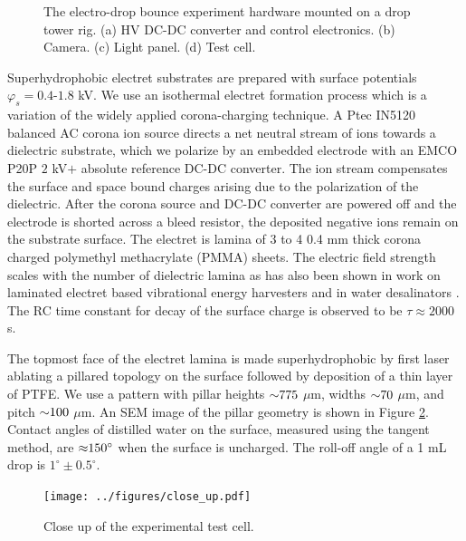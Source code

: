 \documentclass[aip,reprint, floatfix]{revtex4-1}
\begin{document}
\begin{figure}
    \centering
    \fontsize{12pt}{13pt}\selectfont
    \def\svgwidth{\columnwidth}
    \caption{The electro-drop bounce experiment hardware mounted on a drop tower rig. (a) HV DC-DC converter and control electronics. (b) Camera. (c) Light panel. (d) Test cell. \label{fig:rig}}
\end{figure}

Superhydrophobic electret substrates are prepared with surface potentials $\varphi_s = 0.4$-$1.8$ kV. We use an isothermal electret formation process which is a variation of the widely applied corona-charging technique. A Ptec IN5120 balanced AC corona ion source directs a net neutral stream of ions towards a dielectric substrate, which we polarize by an embedded electrode with an EMCO P20P $2$ kV$+$ absolute reference DC-DC converter. The ion stream compensates the surface and space bound charges arising due to the polarization of the dielectric. After the corona source and DC-DC converter are powered off and the electrode is shorted across a bleed resistor, the deposited negative ions remain on the substrate surface. The electret is lamina of 3 to 4 0.4 mm thick corona charged polymethyl methacrylate (PMMA) sheets. The electric field strength scales with the number of dielectric lamina as has also been shown in work on laminated electret based vibrational energy harvesters \cite{wada_stacking_2012} and in water desalinators \cite{ni_desalination_2005}. The RC time constant for decay of the surface charge is observed to be $\tau \approx 2000$ s.

The topmost face of the electret lamina is made superhydrophobic by first laser ablating a pillared topology  on the surface followed by deposition of a thin layer of PTFE. We use a pattern with pillar heights $\sim \hspace{-1mm} 775$ $\mu$m, widths $\sim \hspace{-1mm} 70$ $\mu$m, and pitch $\sim \hspace{-1mm} 100$ $\mu$m. An SEM image of the pillar geometry is shown in Figure \ref{fig:SEM}. Contact angles of distilled water on the surface, measured using the tangent method, are $\approx \hspace{-1mm} 150^{\circ}$ when the surface is uncharged. The roll-off angle of a 1 mL drop is $1^{\circ} \pm 0.5^{\circ}$.

\begin{figure}
    \centering
    \def\svgwidth{\columnwidth}
        \texttt{[image: ../figures/close\_up.pdf]}
    \caption{Close up of the experimental test cell.\label{fig:SEM}}
\end{figure}
\end{document}
